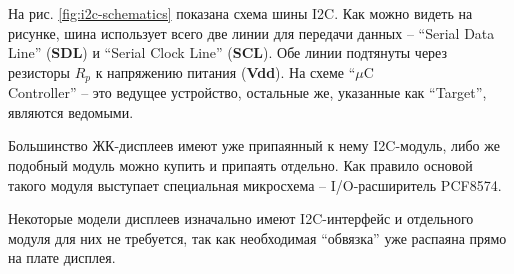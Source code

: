 \documentclass[../sparc.tex]{subfiles}
\begin{document}
На рис. \ref{fig:i2c-schematics} показана схема шины \gls{I2C}. Как можно видеть
на рисунке, шина использует всего две линии для передачи данных -- ``Serial Data
Line'' (\textbf{SDL}) и ``Serial Clock Line'' (\textbf{SCL}). Обе линии
подтянуты через резисторы \textbf{$R_p$} к напряжению питания (\textbf{Vdd}). На
схеме ``$\mu$C\\Controller'' -- это ведущее устройство, остальные же, указанные как
``Target'', являются ведомыми.

Большинство ЖК-дисплеев имеют уже припаянный к нему \gls{I2C}-модуль, либо же
подобный модуль можно купить и припаять отдельно.  Как правило основой такого
модуля выступает специальная микросхема -- \gls{I/O}-расширитель PCF8574.

Некоторые модели дисплеев изначально имеют I2C-интерфейс и отдельного модуля для
них не требуется, так как необходимая ``обвязка'' уже распаяна прямо на плате
дисплея.
\end{document}
